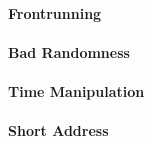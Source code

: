             \paragraph{Frontrunning}
                

            \paragraph{Bad Randomness}
                
        
            \paragraph{Time Manipulation}
                
        
            \paragraph{Short Address}
                
